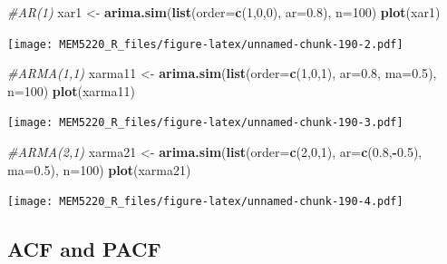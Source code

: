 \documentclass[]{book}
\newenvironment{Shaded}{\begin{snugshade}}{\end{snugshade}}
\newcommand{\CommentTok}[1]{\textcolor[rgb]{0.56,0.35,0.01}{\textit{#1}}}
\newcommand{\DataTypeTok}[1]{\textcolor[rgb]{0.13,0.29,0.53}{#1}}
\newcommand{\DecValTok}[1]{\textcolor[rgb]{0.00,0.00,0.81}{#1}}
\newcommand{\FloatTok}[1]{\textcolor[rgb]{0.00,0.00,0.81}{#1}}
\newcommand{\KeywordTok}[1]{\textcolor[rgb]{0.13,0.29,0.53}{\textbf{#1}}}
\newcommand{\NormalTok}[1]{#1}
\newcommand{\OperatorTok}[1]{\textcolor[rgb]{0.81,0.36,0.00}{\textbf{#1}}}
\newcommand{\StringTok}[1]{\textcolor[rgb]{0.31,0.60,0.02}{#1}}
\begin{document}
\begin{Shaded}
\begin{Highlighting}[]
\CommentTok{#AR(1)}
\NormalTok{xar1 <-}\StringTok{ }\KeywordTok{arima.sim}\NormalTok{(}\KeywordTok{list}\NormalTok{(}\DataTypeTok{order=}\KeywordTok{c}\NormalTok{(}\DecValTok{1}\NormalTok{,}\DecValTok{0}\NormalTok{,}\DecValTok{0}\NormalTok{), }\DataTypeTok{ar=}\FloatTok{0.8}\NormalTok{), }\DataTypeTok{n=}\DecValTok{100}\NormalTok{)}
\KeywordTok{plot}\NormalTok{(xar1)}
\end{Highlighting}
\end{Shaded}

\texttt{[image: MEM5220\_R\_files/figure-latex/unnamed-chunk-190-2.pdf]}

\begin{Shaded}
\begin{Highlighting}[]
\CommentTok{#ARMA(1,1)}
\NormalTok{xarma11 <-}\StringTok{ }\KeywordTok{arima.sim}\NormalTok{(}\KeywordTok{list}\NormalTok{(}\DataTypeTok{order=}\KeywordTok{c}\NormalTok{(}\DecValTok{1}\NormalTok{,}\DecValTok{0}\NormalTok{,}\DecValTok{1}\NormalTok{), }\DataTypeTok{ar=}\FloatTok{0.8}\NormalTok{, }\DataTypeTok{ma=}\FloatTok{0.5}\NormalTok{), }\DataTypeTok{n=}\DecValTok{100}\NormalTok{)}
\KeywordTok{plot}\NormalTok{(xarma11)}
\end{Highlighting}
\end{Shaded}

\texttt{[image: MEM5220\_R\_files/figure-latex/unnamed-chunk-190-3.pdf]}

\begin{Shaded}
\begin{Highlighting}[]
\CommentTok{#ARMA(2,1)}
\NormalTok{xarma21 <-}\StringTok{ }\KeywordTok{arima.sim}\NormalTok{(}\KeywordTok{list}\NormalTok{(}\DataTypeTok{order=}\KeywordTok{c}\NormalTok{(}\DecValTok{2}\NormalTok{,}\DecValTok{0}\NormalTok{,}\DecValTok{1}\NormalTok{), }\DataTypeTok{ar=}\KeywordTok{c}\NormalTok{(}\FloatTok{0.8}\NormalTok{,}\OperatorTok{-}\FloatTok{0.5}\NormalTok{), }\DataTypeTok{ma=}\FloatTok{0.5}\NormalTok{), }\DataTypeTok{n=}\DecValTok{100}\NormalTok{)}
\KeywordTok{plot}\NormalTok{(xarma21)}
\end{Highlighting}
\end{Shaded}

\texttt{[image: MEM5220\_R\_files/figure-latex/unnamed-chunk-190-4.pdf]}

\hypertarget{acf-and-pacf}{%
\subsection{ACF and PACF}\label{acf-and-pacf}}
\end{document}
